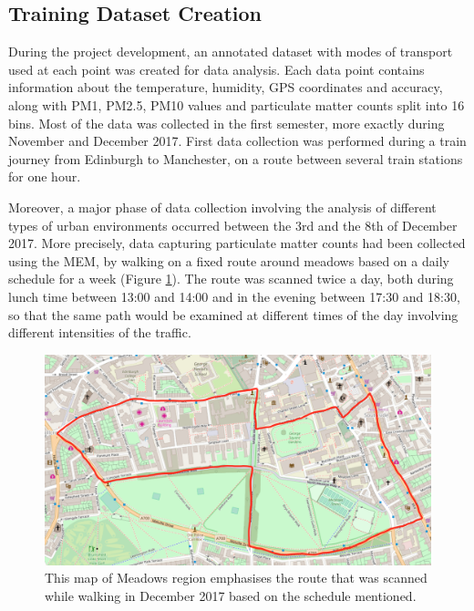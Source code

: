 \documentclass[bsc,frontabs,twoside,singlespacing, parskip,deptreport]{infthesis}     %
\begin{document}
\subsection{Training Dataset Creation}
\label{subsec:training-dataset}

During the project development, an annotated dataset with modes of transport used at each point was created for data analysis. Each data point contains information about the temperature, humidity, GPS coordinates and accuracy, along with PM1, PM2.5, PM10 values and particulate matter counts split into 16 bins. Most of the data was collected in the first semester, more exactly during November and December 2017. First data collection was performed during a train journey from Edinburgh to Manchester, on a route between several train stations for one hour.

Moreover, a major phase of data collection involving the analysis of different types of urban environments occurred between the 3rd and the 8th of December 2017. More precisely, data capturing particulate matter counts had been collected using the MEM, by walking on a fixed route around meadows based on a daily schedule for a week (Figure \ref{fig:december_route}). The route was scanned twice a day, both during lunch time between 13:00 and 14:00 and in the evening between 17:30 and 18:30, so that the same path would be examined at different times of the day involving different intensities of the traffic.

\begin{figure}[h]
  \center
  \includegraphics[width=\columnwidth]{december_route.png} 
  \caption{This map of Meadows region emphasises the route that was scanned while walking in December 2017 based on the schedule mentioned.}
  \label{fig:december_route}
\end{figure}
\end{document}
